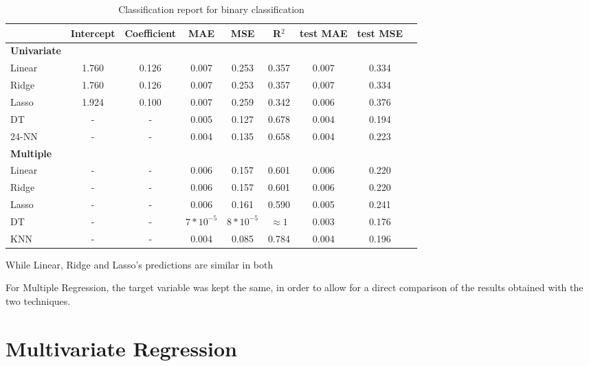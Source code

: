 \begin{table}[H]
    \centering
    \begin{tabular}{lcccccccc}
        \toprule
         & \textbf{Intercept} & \textbf{Coefficient} & \textbf{MAE} & \textbf{MSE} & \textbf{R$^2$} & \textbf{test MAE} & \textbf{test MSE} \\
        \midrule
        \textbf{Univariate} & & & & & \\
        \midrule
        Linear & 1.760 & 0.126 & 0.007 & 0.253 & 0.357 & 0.007 & 0.334 \\
        Ridge & 1.760 & 0.126 & 0.007 & 0.253 & 0.357 & 0.007 & 0.334 \\ %
        Lasso & 1.924 & 0.100 & 0.007 & 0.259 & 0.342 & 0.006 & 0.376 \\ %
        DT & - & - & 0.005 & 0.127 & 0.678 & 0.004 & 0.194 \\
        24-NN & - & - & 0.004 & 0.135 & 0.658 & 0.004 & 0.223 \\
        \midrule
        \textbf{Multiple} & & & & & \\
        \midrule
        Linear & - & - & 0.006 & 0.157 & 0.601 & 0.006 & 0.220 \\
        Ridge & - & - & 0.006 & 0.157 & 0.601 & 0.006 & 0.220 \\ %
        Lasso & - & - & 0.006 & 0.161 & 0.590 & 0.005 & 0.241 \\ %
        DT & - & - & $7 * 10^{-5}$ & $8 * 10^{-5}$ & $\approx 1$ & 0.003 & 0.176 \\
        KNN & - & - & 0.004 & 0.085 & 0.784 & 0.004 & 0.196 \\
        \bottomrule
    \end{tabular}
    \caption{Classification report for binary classification}
    \label{tab:binary_classification_report}
\end{table}
While Linear, Ridge and Lasso's predictions are similar in both 

For Multiple Regression, the target variable was kept the same, in order to
allow for a direct comparison of the results obtained with the two techniques.


\section{Multivariate Regression}
